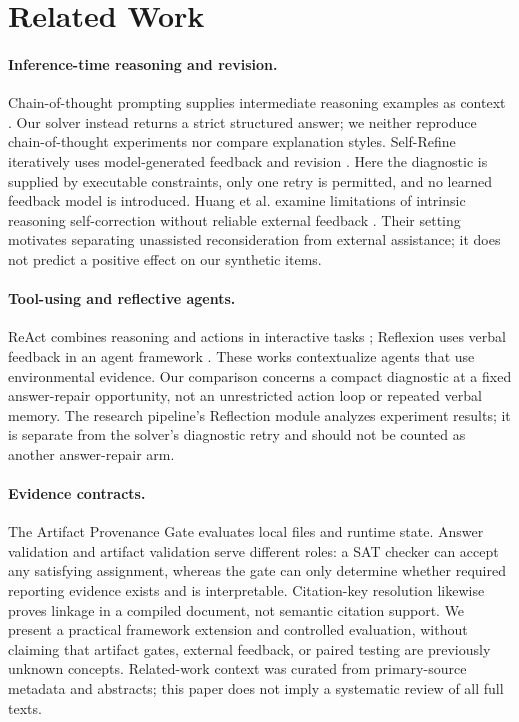 \section{Related Work}
\paragraph{Inference-time reasoning and revision.}
Chain-of-thought prompting supplies intermediate reasoning examples as context \citep{jason20224a94a8d1}. Our solver instead returns a strict structured answer; we neither reproduce chain-of-thought experiments nor compare explanation styles. Self-Refine iteratively uses model-generated feedback and revision \citep{aman2023820a9974}. Here the diagnostic is supplied by executable constraints, only one retry is permitted, and no learned feedback model is introduced. Huang et al. examine limitations of intrinsic reasoning self-correction without reliable external feedback \citep{jie2023fd36c5c8}. Their setting motivates separating unassisted reconsideration from external assistance; it does not predict a positive effect on our synthetic items.

\paragraph{Tool-using and reflective agents.}
ReAct combines reasoning and actions in interactive tasks \citep{shunyu2022f4fcac2c}; Reflexion uses verbal feedback in an agent framework \citep{noah2023b7573199}. These works contextualize agents that use environmental evidence. Our comparison concerns a compact diagnostic at a fixed answer-repair opportunity, not an unrestricted action loop or repeated verbal memory. The research pipeline's Reflection module analyzes experiment results; it is separate from the solver's diagnostic retry and should not be counted as another answer-repair arm.

\paragraph{Evidence contracts.}
The Artifact Provenance Gate evaluates local files and runtime state. Answer validation and artifact validation serve different roles: a SAT checker can accept any satisfying assignment, whereas the gate can only determine whether required reporting evidence exists and is interpretable. Citation-key resolution likewise proves linkage in a compiled document, not semantic citation support. We present a practical framework extension and controlled evaluation, without claiming that artifact gates, external feedback, or paired testing are previously unknown concepts. Related-work context was curated from primary-source metadata and abstracts; this paper does not imply a systematic review of all full texts.
